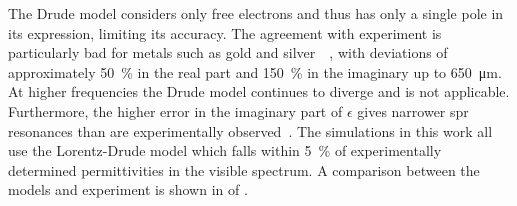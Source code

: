 The Drude model considers only free electrons and thus has only a single pole
in its expression, limiting its accuracy.  The agreement with experiment is
particularly bad for metals such as gold and
silver~\cite{ahmedcomputational}~\cite{jahanshahi2014study}, with deviations
of approximately \SI{50}{\percent} in the real part and \SI{150}{\percent} in
the imaginary up to \SI{650}{\micro\meter}.  At higher frequencies the Drude
model continues to diverge and is not applicable.  Furthermore, the higher
error in the imaginary part of $\epsilon$ gives narrower \gls{spr} resonances than
are experimentally observed~\cite{jahanshahi2014study}.  The simulations in
this work all use the Lorentz-Drude model which falls within \SI{5}{\percent}
of experimentally determined permittivities in the visible spectrum. A
comparison between the models and experiment is shown in
 of .
